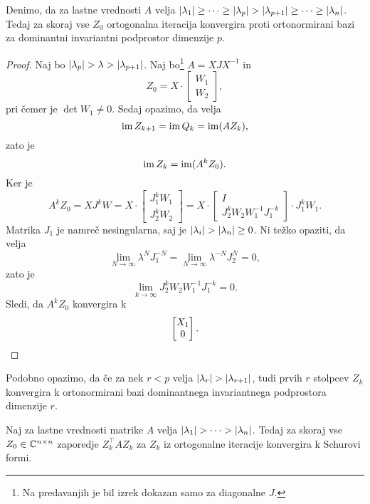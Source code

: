 \begin{izrek}
Denimo, da za lastne vrednosti $A$ velja 
$\left\lvert \lambda_1\right\rvert \geq \dots \geq \left\lvert \lambda_p\right\rvert >
\left\lvert \lambda_{p+1}\right\rvert \geq \dots \geq \left\lvert \lambda_n\right\rvert$. Tedaj za
skoraj vse $Z_0$ ortogonalna iteracija konvergira proti
ortonormirani bazi za dominantni invariantni podprostor dimenzije
$p$.
\end{izrek}

\begin{proof}
Naj bo $\left\lvert \lambda_p\right\rvert > \lambda > \left\lvert \lambda_{p+1}\right\rvert$. Naj
bo\footnote{Na predavanjih je bil izrek dokazan samo za diagonalne
$J$.} $A = XJX^{-1}$ in
\[
Z_0 = X \cdot
\begin{bmatrix}
W_1 \\ W_2
\end{bmatrix},
\]
pri čemer je $\det W_1 \ne 0$. Sedaj opazimo, da velja
\[
\operatorname{im} Z_{k+1} = \operatorname{im} Q_k = \operatorname{im} (AZ_k),
\]
zato je
\[
\operatorname{im} Z_k = \operatorname{im} (A^k Z_0).
\]
Ker je
\[
A^k Z_0 = X J^k W = X \cdot
\begin{bmatrix}
J_1^k W_1 \\ J_2^k W_2
\end{bmatrix} = X \cdot
\begin{bmatrix}
I \\ J_2^k W_2 W_1^{-1} J_1^{-k}
\end{bmatrix} \cdot J_1^k W_1.
\]
Matrika $J_1$ je namreč nesingularna, saj je
$\left\lvert \lambda_i\right\rvert > \left\lvert \lambda_n\right\rvert \geq 0$. Ni težko opaziti, da
velja
\[
\lim_{N \to \infty} \lambda^N J_1^{-N} =
\lim_{N \to \infty} \lambda^{-N} J_2^N = 0,
\]
zato je
\[
\lim_{k \to \infty} J_2^k W_2 W_1^{-1} J_1^{-k} = 0.
\]
Sledi, da $A^k Z_0$ konvergira k
\[
\begin{bmatrix}
X_1 \\ 0
\end{bmatrix}. \qedhere
\]
\end{proof}

\begin{opomba}
Podobno opazimo, da če za nek $r < p$ velja
$\left\lvert \lambda_r\right\rvert > \left\lvert \lambda_{r+1}\right\rvert$, tudi prvih $r$ stolpcev
$Z_k$ konvergira k ortonormirani bazi dominantnega invariantnega
podprostora dimenzije $r$.
\end{opomba}

\begin{izrek}
Naj za lastne vrednosti matrike $A$ velja
$\left\lvert \lambda_1\right\rvert > \dots > \left\lvert \lambda_n\right\rvert$. Tedaj za skoraj vse
$Z_0 \in \mathbb{C}^{n \times n}$ zaporedje $Z_k^\top A Z_k$ za $Z_k$ iz
ortogonalne iteracije konvergira k Schurovi formi.
\end{izrek}

